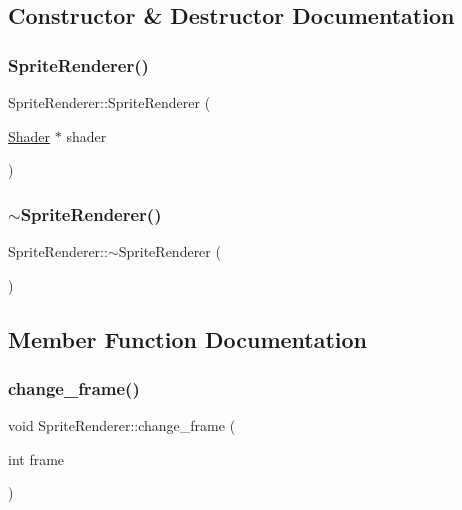 \subsection{Constructor \& Destructor Documentation}
\mbox{\label{classSpriteRenderer_a104f22e721b6d2d1b5e418880dda52a0}} 
\subsubsection{\texorpdfstring{Sprite\+Renderer()}{SpriteRenderer()}}
{\footnotesize\ttfamily Sprite\+Renderer\+::\+Sprite\+Renderer (\begin{DoxyParamCaption}\item[{\hyperlink{classShader}{Shader} $\ast$}]{shader }\end{DoxyParamCaption})}

\mbox{\label{classSpriteRenderer_ae53730ef86000bf59905c2cf67e4d3a4}} 
\subsubsection{\texorpdfstring{$\sim$\+Sprite\+Renderer()}{~SpriteRenderer()}}
{\footnotesize\ttfamily Sprite\+Renderer\+::$\sim$\+Sprite\+Renderer (\begin{DoxyParamCaption}{ }\end{DoxyParamCaption})}



\subsection{Member Function Documentation}
\mbox{\label{classSpriteRenderer_addcfaa66a79d98c20449119bfc4f4cb2}} 
\subsubsection{\texorpdfstring{change\+\_\+frame()}{change\_frame()}}
{\footnotesize\ttfamily void Sprite\+Renderer\+::change\+\_\+frame (\begin{DoxyParamCaption}\item[{int}]{frame }\end{DoxyParamCaption})\hspace{0.3cm}{\ttfamily [inline]}}

